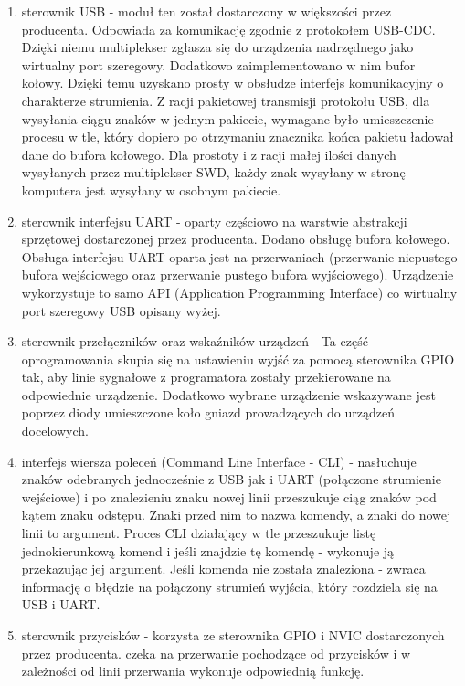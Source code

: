 \begin{enumerate}
    \item sterownik USB - moduł ten został dostarczony w większości przez producenta. Odpowiada za komunikację zgodnie z protokołem USB-CDC. Dzięki niemu multiplekser zgłasza się do urządzenia nadrzędnego jako wirtualny port szeregowy. Dodatkowo zaimplementowano w nim bufor kołowy. Dzięki temu uzyskano prosty w obsłudze interfejs komunikacyjny o charakterze strumienia. Z racji pakietowej transmisji protokołu USB, dla wysyłania ciągu znaków w jednym pakiecie, wymagane było umieszczenie procesu w tle, który dopiero po otrzymaniu znacznika końca pakietu ładował dane do bufora kołowego. Dla prostoty i z racji małej ilości danych wysyłanych przez multiplekser SWD, każdy znak wysyłany w stronę komputera jest wysyłany w osobnym pakiecie.
    \item sterownik interfejsu UART - oparty częściowo na warstwie abstrakcji sprzętowej dostarczonej przez producenta. Dodano obsługę bufora kołowego. Obsługa interfejsu UART oparta jest na przerwaniach (przerwanie niepustego bufora wejściowego oraz przerwanie pustego bufora wyjściowego). Urządzenie wykorzystuje to samo API (Application Programming Interface) co wirtualny port szeregowy USB opisany wyżej.
    \item sterownik przełączników oraz wskaźników urządzeń - Ta część oprogramowania skupia się na ustawieniu wyjść za pomocą sterownika GPIO tak, aby linie sygnałowe z programatora zostały przekierowane na odpowiednie urządzenie. Dodatkowo wybrane urządzenie wskazywane jest poprzez diody umieszczone koło gniazd prowadzących do urządzeń docelowych.
    \item interfejs wiersza poleceń (Command Line Interface - CLI) - nasłuchuje znaków odebranych jednocześnie z USB jak i UART (połączone strumienie wejściowe) i po znalezieniu znaku nowej linii przeszukuje ciąg znaków pod kątem znaku odstępu. Znaki przed nim to nazwa komendy, a znaki do nowej linii to argument. Proces CLI działający w tle przeszukuje listę jednokierunkową komend i jeśli znajdzie tę komendę - wykonuje ją przekazując jej argument. Jeśli komenda nie została znaleziona - zwraca informację o błędzie na połączony strumień wyjścia, który rozdziela się na USB i UART.
    \item sterownik przycisków - korzysta ze sterownika GPIO i NVIC dostarczonych przez producenta. czeka na przerwanie pochodzące od przycisków i w zależności od linii przerwania wykonuje odpowiednią funkcję.
\end{enumerate}

